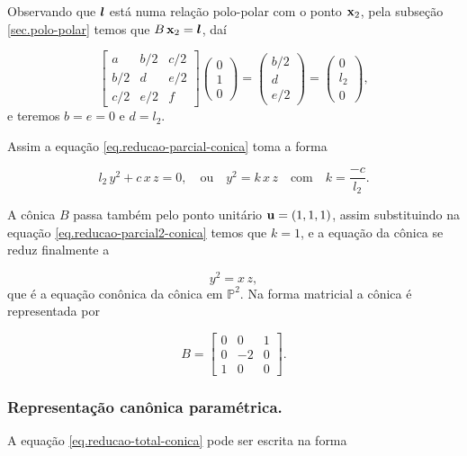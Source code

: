 Observando que $\boldsymbol{l}$ está numa relação polo-polar com o ponto $\mathbf{x}_2$, pela subseção \ref{sec.polo-polar} temos que $B\,\mathbf{x}_2=\boldsymbol{l}$, daí

\begin{equation*}
\begin{bmatrix}
a&b/2&c/2\\
b/2&d&e/2\\
c/2&e/2&f
\end{bmatrix}
\begin{pmatrix}
0\\
1\\
0
\end{pmatrix}
=
\begin{pmatrix}
b/2\\
d\\
e/2
\end{pmatrix}
=
\begin{pmatrix}
0\\
l_2\\
0
\end{pmatrix},
\end{equation*}
e teremos $b=e=0$ e $d=l_2$.

Assim a equação \ref{eq.reducao-parcial-conica} toma a forma

\begin{equation}\label{eq.reducao-parcial2-conica}
l_2\,y^2+c\,x\,z=0,\quad\text{ou}\quad y^2=k\,x\,z\quad\text{com}\quad k=\frac{-c}{l_2}.
\end{equation}

A cônica $B$ passa também pelo ponto unitário ${\bf u}=(1,1,1)$, assim substituindo na equação \ref{eq.reducao-parcial2-conica} temos que $k=1$, e a equação da cônica se reduz finalmente a 

\begin{equation}\label{eq.reducao-total-conica}
y^2=x\,z,
\end{equation}
que é a equação conônica da cônica em $\mathbb{P}^2$. Na forma matricial a cônica é representada por 

\begin{equation*}
B=
\begin{bmatrix}
0&0&1\\
0&-2&0\\
1&0&0
\end{bmatrix}.
\end{equation*}

\subsubsection{Representação canônica paramétrica.}\label{sec.repre-canonica-parametrica}
A equação \ref{eq.reducao-total-conica} pode ser escrita na forma 

